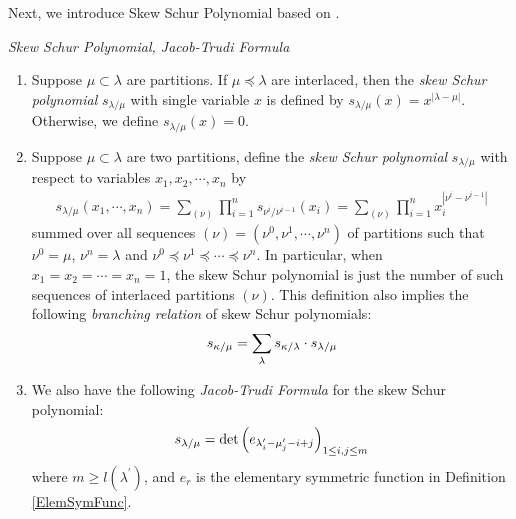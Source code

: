 Next, we introduce Skew Schur Polynomial based on \cite[Chapter 1, (5.5), (5.11), (5.12)]{Mac}.
\begin{definition} \emph{Skew Schur Polynomial, Jacob-Trudi Formula}{\label{DefSkewSchurPoly}}
\begin{enumerate}
	\item Suppose $\mu\subset\lambda$ are partitions. If $\mu\preceq\lambda$ are interlaced, then the \emph{skew Schur polynomial} $s_{\lambda/\mu}$ with single variable $x$ is defined by $s_{\lambda/\mu}(x)=x^{|\lambda-\mu|}$. Otherwise, we define $s_{\lambda/\mu}(x)=0$.
	\item Suppose $\mu\subset\lambda$ are two partitions, define the \emph{skew Schur polynomial} $s_{\lambda/\mu}$ with respect to variables $x_1, x_2, \cdots, x_{n}$ by
	\begin{align}
		s_{\lambda/\mu}(x_1,\cdots,x_n)=\sum_{(\nu)}\prod_{i=1}^{n}s_{\nu^{i}/\nu^{i-1}}(x_i)=\sum_{(\nu)}\prod_{i=1}^{n}x_{i}^{|\nu^{i}-\nu^{i-1}|}
	\end{align}
	summed over all sequences $(\nu)=(\nu^{0},\nu^{1},\cdots,\nu^{n})$ of partitions such that $\nu^{0}=\mu$, $\nu^{n}=\lambda$ and $\nu^{0}\preceq\nu^{1}\preceq\cdots\preceq\nu^{n}$. In particular, when $x_1=x_2=\cdots=x_{n}=1$, the skew Schur polynomial is just the number of such sequences of interlaced partitions $(\nu)$.	 This definition also implies the following \emph{branching relation} of skew Schur polynomials:
	\begin{equation}{\label{Branch}}
		\begin{split}
			s_{\kappa/\mu}=\sum_{\lambda}s_{\kappa/\lambda}\cdot s_{\lambda/\mu}
		\end{split}
	\end{equation}
	\item We also have the following \emph{Jacob-Trudi Formula}\cite[Chapter 1, (5.5)]{Mac} for the skew Schur polynomial:
	\begin{equation}{\label{J-TFormula}}
		s_{\lambda/\mu}=\det\left(e_{\lambda_{i}^{\prime}-\mu_{j}^{\prime}-i+j}\right)_{1\leq i,j\leq m}
	\end{equation}
	where $m\geq l(\lambda^{\prime})$, and $e_r$ is the elementary symmetric function in Definition \ref{ElemSymFunc}.
\end{enumerate}
\end{definition}

